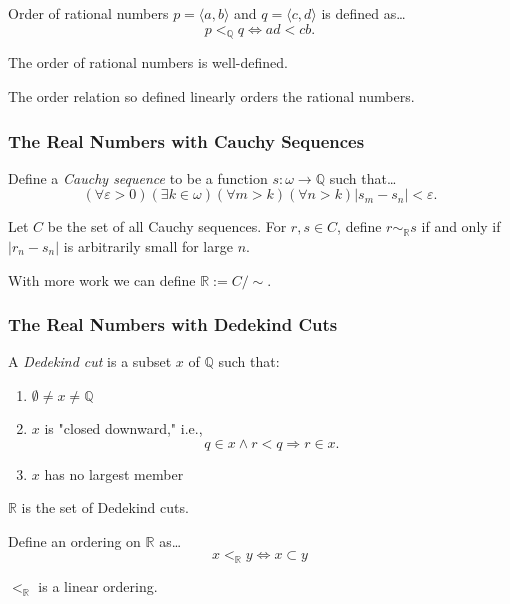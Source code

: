 Order of rational numbers $p = \langle a, b \rangle$ and $q = \langle c, d \rangle$ is defined as\dots
$$p <_{\mathbb{Q}} q \Leftrightarrow ad < cb.$$

\begin{lemma}
The order of rational numbers is well-defined.
\end{lemma}

\noindent The order relation so defined linearly orders the rational numbers.

\subsubsection{The Real Numbers with Cauchy Sequences}\label{realnumberswithcauchysequences}

Define a \emph{Cauchy sequence} to be a function $s: \omega \rightarrow \mathbb{Q}$ such that\dots
$$(\forall \varepsilon > 0)(\exists k \in \omega)(\forall m > k)(\forall n > k) |s_m - s_n| < \varepsilon.$$

\noindent Let $C$ be the set of all Cauchy sequences. For $r,s \in C$, define $r \sim_{\mathbb{R}} s$ if and only if $|r_n - s_n|$
is arbitrarily small for large $n$.\newline

\noindent With more work we can define $\mathbb{R} := C / \sim$.

\subsubsection{The Real Numbers with Dedekind Cuts}\label{realnumberswithdedekindcuts}

A \emph{Dedekind cut} is a subset $x$ of $\mathbb{Q}$ such that:
\begin{enumerate}
  \item $\emptyset \neq x \neq \mathbb{Q}$
  \item $x$ is "closed downward," i.e.,
		$$q \in x \land r < q \Rightarrow r \in x.$$
  \item $x$ has no largest member
\end{enumerate}

\noindent $\mathbb{R}$ is the set of Dedekind cuts.

Define an ordering on $\mathbb{R}$ as\dots
$$x <_{\mathbb{R}} y \Leftrightarrow x \subset y$$

\begin{proposition}
$<_{\mathbb{R}}$ is a linear ordering.
\end{proposition}


